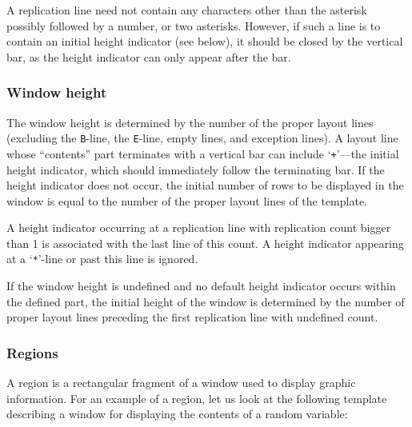 A replication line need not contain any characters other than the asterisk
possibly followed by a number, or two asterisks.
However, if such a line is to contain an initial height indicator
(see below), it should be closed by the vertical bar, as the height
indicator can only appear after the bar.

\subsubsection{Window height}
\label{rm_ds_tp_wh}

The window height is determined by the number of the proper layout lines
(excluding the {\tt B}-line, the {\tt E}-line, empty lines, and exception
lines).
A layout line whose ``contents'' part terminates with a vertical bar can
include `{\tt +}'---the initial height indicator,
which should immediately follow the terminating bar.
If the height indicator
does not occur, the initial number of rows to be displayed in the window
is equal to the number of the proper layout lines of the template.

A height indicator occurring at a replication line with replication count
bigger than 1 is associated with the last line of this count.
A height indicator appearing at a `{\tt **}'-line or past this line is ignored.

If the window height is undefined
and no default height indicator occurs within the defined part,
the initial height of the window is determined by the number of proper
layout lines preceding the first replication line with undefined count.

\subsubsection{Regions}
\label{rm_ds_tp_re}

A region is a rectangular fragment of a window used to display graphic
information.
For an example of a region, let us look at the following template describing
a window for displaying the contents of a random variable:

